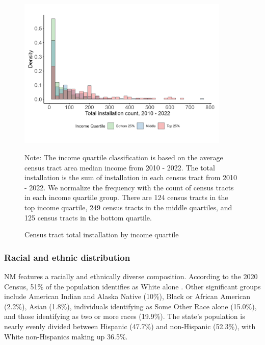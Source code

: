 \documentclass[11pt,twoside,letterpaper]{article}
\begin{document}
\begin{figure}[!ht]
    \centering
\includegraphics[width=0.9\textwidth]{figures/comparative_histogram_installation.png}
    \caption{Census tract total installation by income quartile}
    \label{fig:comparative_histogram_installation}
        \begin{flushleft}
        \footnotesize Note: The income quartile classification is based on the average census tract area median income from 2010 - 2022. The total installation is the sum of installation in each census tract from 2010 - 2022. We normalize the frequency with the count of census tracts in each income quartile group. There are 124 census tracts in the top income quartile, 249 census tracts in the middle quartiles, and 125 census tracts in the bottom quartile.
    \end{flushleft}
\end{figure}

\subsubsection{Racial and ethnic distribution}

NM features a racially and ethnically diverse composition. According to the 2020 Census, 51\% of the population identifies as White alone \parencite{uscensus2020}. Other significant groups include American Indian and Alaska Native (10\%), Black or African American (2.2\%), Asian (1.8\%), individuals identifying as Some Other Race alone (15.0\%), and those identifying as two or more races (19.9\%). The state’s population is nearly evenly divided between Hispanic (47.7\%) and non-Hispanic (52.3\%), with White non-Hispanics making up 36.5\%.
\end{document}

